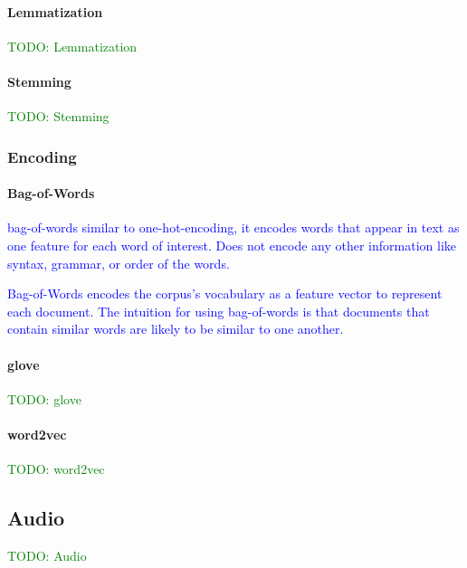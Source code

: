 \paragraph{Lemmatization}

\textcolor{green}{TODO: Lemmatization}

\paragraph{Stemming}

\textcolor{green}{TODO: Stemming}

\subsubsection{Encoding}

\paragraph{Bag-of-Words}

\textcolor{blue}{{bag-of-words} similar to one-hot-encoding, it encodes words that appear in text as one feature for each word of interest. Does not encode any other information like syntax, grammar, or order of the words.}

\textcolor{blue}{Bag-of-Words encodes the corpus's vocabulary as a feature vector to represent each document. The intuition for using bag-of-words is that documents that contain similar words are likely to be similar to one another.}


\paragraph{glove}

\textcolor{green}{TODO: glove}

\paragraph{word2vec}

\textcolor{green}{TODO: word2vec}


\subsection{Audio}

\textcolor{green}{TODO: Audio}
